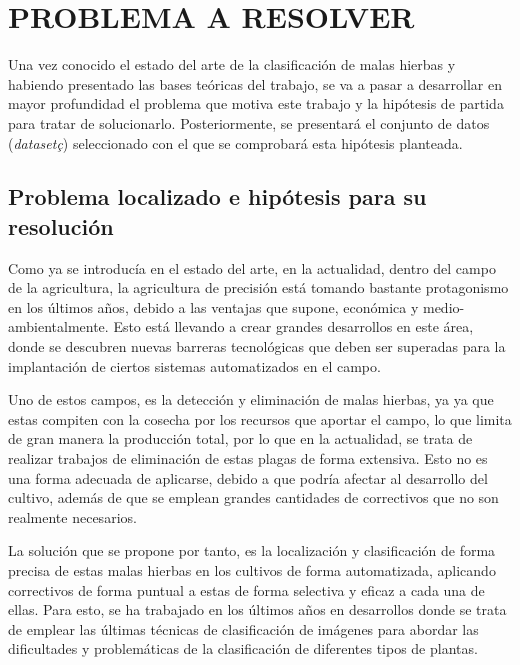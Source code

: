 %
\chapter{PROBLEMA A RESOLVER}
\label{sec:problema}

Una vez conocido el estado del arte de la clasificación de malas hierbas y habiendo presentado las bases teóricas del trabajo, se va a pasar a desarrollar en mayor profundidad el problema que motiva este trabajo y la hipótesis de partida para tratar de solucionarlo. Posteriormente, se presentará el conjunto de datos (\textit{datasetç}) seleccionado con el que se comprobará esta hipótesis planteada.

\section{Problema localizado e hipótesis para su resolución}

Como ya se introducía en el estado del arte, en la actualidad, dentro del campo de la agricultura, la agricultura de precisión está tomando bastante protagonismo en los últimos años, debido a las ventajas que supone, económica y medio-ambientalmente. Esto está llevando a crear grandes desarrollos en este área, donde se descubren nuevas barreras tecnológicas que deben ser superadas para la implantación de ciertos sistemas automatizados en el campo.

Uno de estos campos, es la detección y eliminación de malas hierbas, ya ya que estas compiten con la cosecha por los recursos que aportar el campo, lo que limita de gran manera la producción total, por lo que en la actualidad, se trata de realizar trabajos de eliminación de estas plagas de forma extensiva. Esto no es una forma adecuada de aplicarse, debido a que podría afectar al desarrollo del cultivo, además de que se emplean grandes cantidades de correctivos que no son realmente necesarios.

La solución que se propone por tanto, es la localización y clasificación de forma precisa de estas malas hierbas en los cultivos de forma automatizada, aplicando correctivos de forma puntual a estas de forma selectiva y eficaz a cada una de ellas. Para esto, se ha trabajado en los últimos años en desarrollos donde se trata de emplear las últimas técnicas de clasificación de imágenes para abordar las dificultades y problemáticas de la clasificación de diferentes tipos de plantas.

